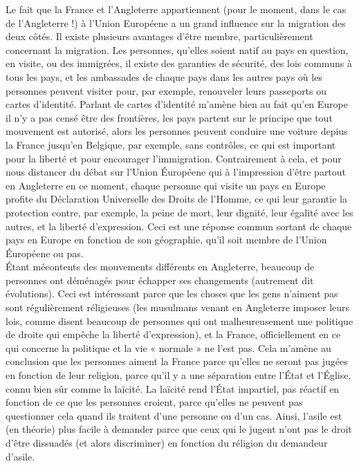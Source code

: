\documentclass[12pt]{article}
\begin{document}
Le fait que la France et l'Angleterre appartiennent (pour le moment,
dans le cas de l'Angleterre !) à l'Union Européene a un grand
influence sur la migration des deux côtés. Il existe plusieurs
avantages d'être membre, particulièrement concernant la migration. Les
personnes, qu'elles soient natif au pays en question, en visite, ou
des immigrées, il existe des garanties de sécurité, des lois communs à
tous les pays, et les ambassades de chaque pays dans les autres pays
où les personnes peuvent visiter pour, par exemple, renouveler leurs
passeports ou cartes d'identité. Parlant de cartes d'identité m'amène
bien au fait qu'en Europe il n'y a pas censé être des frontières, les
pays partent sur le principe que tout mouvement est autorisé, alors
les personnes peuvent conduire une voiture depius la France jusqu'en
Belgique, par exemple, sans contrôles, ce qui est important pour la
liberté et pour encourager l'immigration. Contrairement à cela, et
pour nous distancer du débat sur l'Union Éuropéene qui à l'impression
d'être partout en Angleterre en ce moment, chaque personne qui visite
un pays en Europe profite du Déclaration Universelle des Droits de
l'Homme, ce qui leur garantie la protection contre, par exemple, la
peine de mort, leur dignité, leur égalité avec les autres, et la
liberté d'expression. Ceci est une réponse commun sortant de chaque
pays en Europe en fonction de son géographie, qu'il soit membre de
l'Union Éuropéene ou pas.\\

Étant mécontents des mouvements différents en Angleterre, beaucoup de
personnes ont déménagés pour échapper ses changements (autrement dit
évolutions). Ceci est intéressant parce que les choses que les
gens n'aiment pas sont régulièrement réligieuses (les musulmans venant
en Angleterre imposer leurs lois, comme disent beaucoup de personnes
qui ont malheureusement une politique de droite qui empêche la liberté
d'expression), et la France, officiellement en ce qui concerne la
politique et la vie « normale » ne l'est pas. Cela m'amène au
conclusion que les personnes aiment la France parce qu'elles ne seront
pas jugées en fonction de leur religion, parce qu'il y a une séparation
entre l'État et l'Église, connu bien sûr comme la laïcité. La laïcité
rend l'État impartiel, pas réactif en fonction de ce que les personnes
croient, parce qu'elles ne peuvent pas questionner cela quand ils
traitent d'une personne ou d'un cas. Ainsi, l'asile est (en théorie)
plus facile à demander parce que ceux qui le jugent n'ont pas le droit
d'être dissuadés (et alors discriminer) en fonction du réligion du
demandeur d'asile.\\
\end{document}
